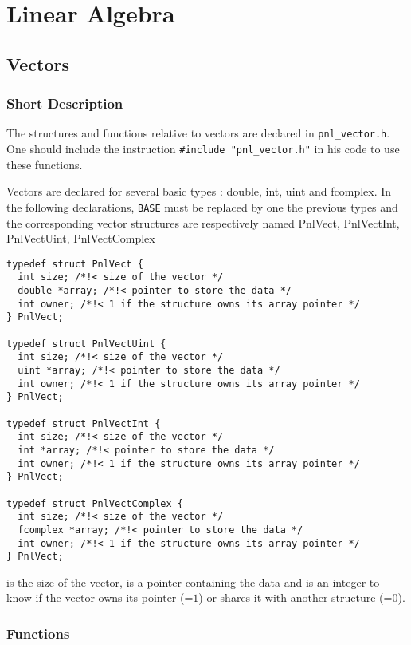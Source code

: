 \section{Linear Algebra}


\subsection{Vectors}
\subsubsection{Short Description}

The structures and functions relative to vectors are declared in
\verb!pnl_vector.h!. One should include the instruction
\verb!#include "pnl_vector.h"! in his code to use these functions.


Vectors are declared for several basic types : double, int, uint and
fcomplex. In the following declarations, {\tt BASE} must be replaced by one
the previous types and the corresponding vector structures are respectively
named PnlVect, PnlVectInt, PnlVectUint, PnlVectComplex
\begin{verbatim}
typedef struct PnlVect {
  int size; /*!< size of the vector */ 
  double *array; /*!< pointer to store the data */
  int owner; /*!< 1 if the structure owns its array pointer */
} PnlVect;

typedef struct PnlVectUint {
  int size; /*!< size of the vector */ 
  uint *array; /*!< pointer to store the data */
  int owner; /*!< 1 if the structure owns its array pointer */
} PnlVect;

typedef struct PnlVectInt {
  int size; /*!< size of the vector */ 
  int *array; /*!< pointer to store the data */
  int owner; /*!< 1 if the structure owns its array pointer */
} PnlVect;

typedef struct PnlVectComplex {
  int size; /*!< size of the vector */ 
  fcomplex *array; /*!< pointer to store the data */
  int owner; /*!< 1 if the structure owns its array pointer */
} PnlVect;
\end{verbatim}
 is the size of the vector,  is a pointer containing the
data and  is an integer to know if the vector owns its 
pointer (=$1$) or shares it with another structure (=$0$).

\subsubsection{Functions}

